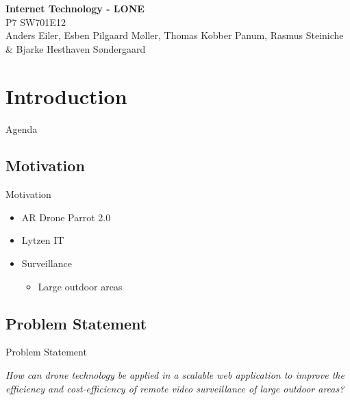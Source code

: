 \author{Rasmus Steiniche}
\begin{frame}{}
	\begin{center}
		\huge \textbf{Internet Technology - LONE}\\
		\normalsize P7 SW701E12\\
		\tiny{Anders Eiler, Esben Pilgaard Møller, Thomas Kobber Panum,}
		\tiny{Rasmus Steiniche \& Bjarke Hesthaven Søndergaard}
	\end{center}
\end{frame}

\section{Introduction}
\begin{frame}{Agenda}{}
\tableofcontents
\end{frame}

\subsection{Motivation}
\begin{frame}{Motivation}
\begin{itemize}
	\item AR Drone Parrot 2.0
	\item Lytzen IT
	\item Surveillance
	\begin{itemize}
		\item Large outdoor areas
	\end{itemize}
\end{itemize}
\end{frame}

\subsection{Problem Statement}
\begin{frame}{Problem Statement}
\begin{center}
	\textit{How can drone technology be applied in a scalable web application to improve the efficiency and cost-efficiency of remote video surveillance of large outdoor areas?}
\end{center}
\end{frame}
